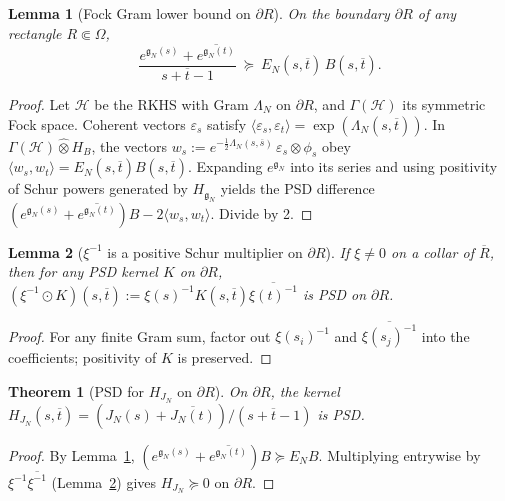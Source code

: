 \documentclass[11pt]{article}
\newtheorem{theorem}{Theorem}
\newtheorem{lemma}{Lemma}
\theoremstyle{remark}
\begin{document}
\begin{lemma}[Fock Gram lower bound on \(\partial R\)]\label{lem:fock}
On the boundary \(\partial R\) of any rectangle \(R\Subset\Omega\),
\[\frac{e^{\mathfrak g_N(s)}+\overline{e^{\mathfrak g_N(t)}}}{s+\overline t-1}\ \succeq\ E_N(s,\overline t)\,B(s,\overline t).\]
\end{lemma}
\begin{proof}
Let \(\mathcal H\) be the RKHS with Gram \(\Lambda_N\) on \(\partial R\), and \(\Gamma(\mathcal H)\) its symmetric Fock space. Coherent vectors \(\varepsilon_s\) satisfy \(\langle \varepsilon_s,\varepsilon_t\rangle=\exp(\Lambda_N(s,\overline t))\). In \(\Gamma(\mathcal H)\widehat\otimes H_B\), the vectors \(w_s:=e^{-\frac12\Lambda_N(s,\overline s)}\,\varepsilon_s\otimes\phi_s\) obey \(\langle w_s,w_t\rangle=E_N(s,\overline t)B(s,\overline t)\). Expanding \(e^{\mathfrak g_N}\) into its series and using positivity of Schur powers generated by \(H_{\mathfrak g_N}\) yields the PSD difference \((e^{\mathfrak g_N(s)}+\overline{e^{\mathfrak g_N(t)}})B-2\langle w_s,w_t\rangle\). Divide by 2.
\end{proof}

\begin{lemma}[\(\xi^{-1}\) is a positive Schur multiplier on \(\partial R\)]\label{lem:schurmult}
If \(\xi\ne 0\) on a collar of \(\overline R\), then for any PSD kernel \(K\) on \(\partial R\), \( (\xi^{-1}\odot K)(s,\overline t):=\xi(s)^{-1}K(s,\overline t)\overline{\xi(t)^{-1}}\) is PSD on \(\partial R\).
\end{lemma}
\begin{proof}
For any finite Gram sum, factor out \(\xi(s_i)^{-1}\) and \(\overline{\xi(s_j)^{-1}}\) into the coefficients; positivity of \(K\) is preserved.
\end{proof}

\begin{theorem}[PSD for \(H_{J_N}\) on \(\partial R\)]\label{thm:HJN}
On \(\partial R\), the kernel \(H_{J_N}(s,\overline t)=(J_N(s)+\overline{J_N(t)})/(s+\overline t-1)\) is PSD.
\end{theorem}
\begin{proof}
By Lemma~\ref{lem:fock}, \((e^{\mathfrak g_N(s)}+\overline{e^{\mathfrak g_N(t)}})B\succeq E_N B\). Multiplying entrywise by \(\xi^{-1}\overline{\xi^{-1}}\) (Lemma~\ref{lem:schurmult}) gives \(H_{J_N}\succeq 0\) on \(\partial R\).
\end{proof}
\end{document}
